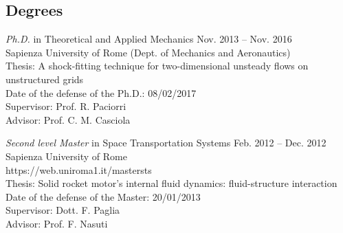 \documentclass[11pt]{res} %
\begin{document}
\begin{resume}
\section{{Degrees}}
{\sl Ph.D.} 
in Theoretical and Applied Mechanics \hfill Nov. 2013 -- Nov. 2016 \\ 
Sapienza University of Rome (Dept. of Mechanics and Aeronautics)\\
Thesis:  A shock-fitting technique for two-dimensional unsteady flows on unstructured grids \\
Date of the defense of the Ph.D.: 08/02/2017 \\
Supervisor: Prof. R. Paciorri  \\
Advisor: Prof. C. M. Casciola

{\sl Second level Master}  
in Space Transportation Systems  \hfill Feb. 2012 -- Dec. 2012 \\ 
Sapienza University of Rome\\
https://web.uniroma1.it/mastersts \\
Thesis: Solid rocket motor's internal fluid dynamics: fluid-structure interaction \\ 
Date of the defense of the Master: 20/01/2013 \\
Supervisor: Dott. F. Paglia \\ 
Advisor: Prof. F. Nasuti 
 

\end{resume}
\end{document}
